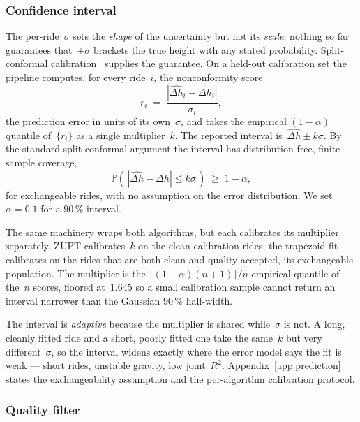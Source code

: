 \documentclass[manuscript,review,screen]{acmart}
\begin{document}
\subsubsection{Confidence interval}
\label{sec:algo-ci}

The per-ride~$\sigma$ sets the \emph{shape} of the uncertainty but
not its \emph{scale}: nothing so far guarantees that~$\pm\sigma$
brackets the true height with any stated probability.  Split-conformal
calibration~\cite{lei2014split} supplies the guarantee.  On a held-out
calibration set the pipeline computes, for every ride~$i$, the
nonconformity score
\begin{equation}
  r_i \;=\; \frac{|\widehat{\Delta h}_i - \Delta h_i|}{\sigma_i},
  \label{eq:nonconformity}
\end{equation}
the prediction error in units of its own~$\sigma$, and takes the
empirical $(1-\alpha)$ quantile of~$\{r_i\}$ as a single
multiplier~$k$.  The reported interval is~$\widehat{\Delta h}\pm
k\sigma$.  By the standard split-conformal argument the interval has
distribution-free, finite-sample coverage,
\begin{equation}
  \mathbb{P}\!\left(\,|\widehat{\Delta h}-\Delta h|\le k\sigma\,\right)
  \;\ge\; 1-\alpha,
  \label{eq:conformal-coverage}
\end{equation}
for exchangeable rides, with no assumption on the error
distribution.  We set $\alpha=0.1$ for a $90\,\%$ interval.

The same machinery wraps both algorithms, but each calibrates its
multiplier separately.  ZUPT calibrates~$k$ on the clean
calibration rides; the trapezoid fit calibrates on the rides that are
both clean and quality-accepted, its exchangeable population.  The
multiplier is the $\lceil(1-\alpha)(n+1)\rceil/n$ empirical quantile
of the~$n$ scores, floored at~$1.645$ so a small calibration sample
cannot return an interval narrower than the Gaussian $90\,\%$
half-width.

The interval is \emph{adaptive} because the multiplier is shared
while~$\sigma$ is not.  A long, cleanly fitted ride and a short,
poorly fitted one take the same~$k$ but very different~$\sigma$, so
the interval widens exactly where the error model says the fit is
weak --- short rides, unstable gravity, low joint~$R^{2}$.
Appendix~\ref{app:prediction} states the exchangeability assumption
and the per-algorithm calibration protocol.

\subsubsection{Quality filter}
\label{sec:algo-quality}
\end{document}
